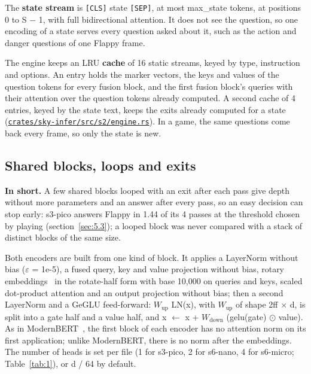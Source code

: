 \documentclass[10pt]{article}
\begin{document}
The \textbf{state stream} is \texttt{[CLS]} state \texttt{[SEP]}, at most max\_state tokens, at positions 0 to S $-$ 1, with full bidirectional attention. It does not see the question, so one encoding of a state serves every question asked about it, such as the action and danger questions of one Flappy frame.

The engine keeps an LRU \textbf{cache} of 16 static streams, keyed by type, instruction and options. An entry holds the marker vectors, the keys and values of the question tokens for every fusion block, and the first fusion block's queries with their attention over the question tokens already computed. A second cache of 4 entries, keyed by the state text, keeps the exits already computed for a state (\href{https://github.com/maxgfr/skycmd/blob/main/crates/sky-infer/src/s2/engine.rs}{\texttt{crates/\allowbreak{}sky-infer/\allowbreak{}src/\allowbreak{}s2/\allowbreak{}engine.rs}}). In a game, the same questions come back every frame, so only the state is new.

\subsection{Shared blocks, loops and exits}\label{sec:3.4}

\textbf{In short.} A few shared blocks looped with an exit after each pass give depth without more parameters and an answer after every pass, so an easy decision can stop early: s3-pico answers Flappy in 1.44 of its 4 passes at the threshold chosen by playing (section~\ref{sec:5.3}); a looped block was never compared with a stack of distinct blocks of the same size.

Both encoders are built from one kind of block. It applies a LayerNorm without bias ($\varepsilon$ = 1e-5), a fused query, key and value projection without bias, rotary embeddings~\cite{su2021roformer} in the rotate-half form with base 10,000 on queries and keys, scaled dot-product attention and an output projection without bias; then a second LayerNorm and a GeGLU feed-forward: $W_{\mathrm{up}}$ LN(x), with $W_{\mathrm{up}}$ of shape 2ff $\times$ d, is split into a gate half and a value half, and x $\gets$ x + $W_{\mathrm{down}}$ (gelu(gate) $\odot$ value). As in ModernBERT~\cite{warner2024modernbert}, the first block of each encoder has no attention norm on its first application; unlike ModernBERT, there is no norm after the embeddings. The number of heads is set per file (1 for s3-pico, 2 for s6-nano, 4 for s6-micro; Table~\ref{tab:1}), or d / 64 by default.
\end{document}
